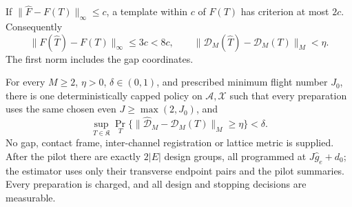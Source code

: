 If \(\|\widehat F-F(T)\|_\infty\le c\), a template within \(c\) of
\(F(T)\) has criterion at most \(2c\).  Consequently
\begin{equation}\label{eq:v25-deterministic-estimator-bound}
 \|F(\widehat T)-F(T)\|_\infty\le3c<8c,\qquad
 \|\mathcal D_M(\widehat T)-\mathcal D_M(T)\|_M<\eta.
\end{equation}
The first norm includes the gap coordinates.

\begin{theorem}
\label{thm:v26-fixed-order-physical}
\label{thm:v25-fixed-order-physical}
\label{thm:v24-fixed-M-physical-estimability}
For every \(M\ge2\), \(\eta>0\), \(\delta\in(0,1)\), and prescribed
minimum flight number \(J_0\), there is one deterministically capped policy
on \(\mathscr A,\mathscr X\) such that every preparation uses the same
chosen even \(J\ge\max(2,J_0)\), and
\begin{equation}\label{eq:v25-fixed-order-risk}
 \sup_{T\in\mathfrak K}
 \Pr_T\{\|\widehat{\mathcal D}_M-\mathcal D_M(T)\|_M\ge\eta\}<\delta.
\end{equation}
No gap, contact frame, inter-channel registration or lattice metric is
supplied.  After the pilot there are exactly \(2|E|\) design groups,
all programmed at \(J\widehat g_e+d_0\); the estimator uses only their
transverse endpoint pairs and the pilot summaries.  Every preparation is
charged, and all design and stopping decisions are measurable.
\end{theorem}

